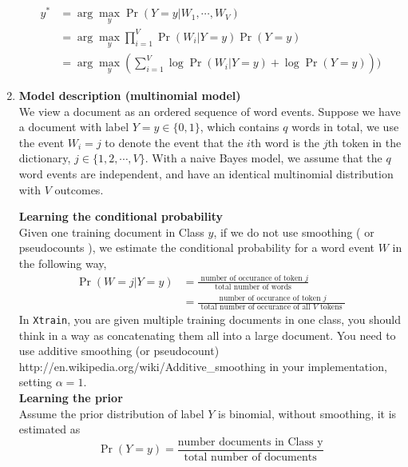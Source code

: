 \documentclass[11pt]{article}
\begin{document}
\begin{enumerate}
\begin{align*}
 y^* & = \arg\max_y \Pr(Y = y |W_1, \cdots, W_V)  \\
     & =  \arg\max_y  \prod_{i=1}^{V} \Pr( W_i| Y = y) \Pr( Y = y)\\
     & =  \arg\max_y  (\sum_{i=1}^{V} \log \Pr( W_i| Y = y) + \log \Pr( Y = y)))
\end{align*}
\fi

\item \textbf{Model description (multinomial model)}\\
We view a document as an ordered sequence of word events. 
Suppose we have a document with label $Y=y \in \{0,1\}$, which contains $q$ words in total, we use the event $W_i = j$ to denote the event that the $i$th word is the $j$th token in the dictionary, $j \in \{ 1,2, \cdots, V \}$. 
With a naive Bayes model, we assume that the $q$ word events are independent, and have an identical multinomial distribution with $V$ outcomes. 

\textbf{Learning the conditional probability}\\
Given one training document in Class $y$, if we do not use smoothing ( or pseudocounts ), we estimate the conditional probability for a word event $W$ in the following way,
\begin{align*}
\Pr( W = j| Y = y)  &= \frac{ \text{ number of occurance of token $j$}}{ \text{ total number of words }} \\
&  = \frac{ \text{ number of occurance of token $j$}}{ \text{ total number of occurance of all $V$ tokens  }}
\end{align*}
In \texttt{Xtrain}, you are given multiple training documents in one class, you should think in a way as concatenating them all into a large document. 
You need to use additive smoothing (or pseudocount)
http://en.wikipedia.org/wiki/Additive\_smoothing in your implementation, setting $\alpha = 1$. \\

\textbf{Learning the prior}\\
Assume the prior distribution of label $Y$ is binomial, without smoothing, it is estimated as 
\[ \Pr(Y = y) = \frac{ \text{number documents in Class y}} { \text{total number of documents}}\] 



\end{enumerate}
\end{document}
